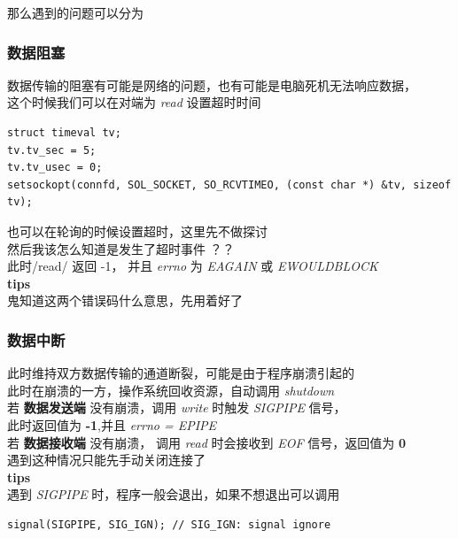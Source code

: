 \documentclass[11pt]{article}
\begin{document}
那么遇到的问题可以分为\\
\subsubsection{数据阻塞}
\label{sec:org9c37d77}
数据传输的阻塞有可能是网络的问题，也有可能是电脑死机无法响应数据，\\

这个时候我们可以在对端为 \emph{read} 设置超时时间\\
\begin{verbatim}
struct timeval tv;
tv.tv_sec = 5;
tv.tv_usec = 0;
setsockopt(connfd, SOL_SOCKET, SO_RCVTIMEO, (const char *) &tv, sizeof tv);
\end{verbatim}

也可以在轮询的时候设置超时，这里先不做探讨\\

然后我该怎么知道是发生了超时事件 ？？\\
此时/read/ 返回 -1， 并且 \emph{errno} 为 \emph{EAGAIN} 或 \emph{EWOULDBLOCK}\\
\textbf{\textbf{tips}}\\
鬼知道这两个错误码什么意思，先用着好了\\

\subsubsection{数据中断}
\label{sec:orge9eb92b}
此时维持双方数据传输的通道断裂，可能是由于程序崩溃引起的\\
此时在崩溃的一方，操作系统回收资源，自动调用 \emph{shutdown}  \\

若 \textbf{数据发送端} 没有崩溃，调用 \emph{write} 时触发 \emph{SIGPIPE} 信号，\\
此时返回值为 \textbf{-1},并且 \emph{errno = EPIPE}\\

若 \textbf{数据接收端} 没有崩溃， 调用 \emph{read} 时会接收到 \emph{EOF} 信号，返回值为 \textbf{0}\\

遇到这种情况只能先手动关闭连接了\\
\textbf{\textbf{tips}}\\
遇到 \emph{SIGPIPE} 时，程序一般会退出，如果不想退出可以调用\\
\begin{verbatim}
signal(SIGPIPE, SIG_IGN); // SIG_IGN: signal ignore
\end{verbatim}
\end{document}
